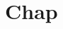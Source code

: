 \documentclass{book}
\newcommand{\Texinfothechapterheading}{}
\newcommand{\Texinfoheadingchaptername}{\chaptername}
\newcommand{\Texinfochapter}[1]{\chapter{#1}
\renewcommand{\Texinfothechapterheading}{\Texinfoheadingchaptername{} \thechapter{} }%
}%
\renewcommand{\_}{\Texinfounderscore\discretionary{}{}{}}
\begin{document}
\label{anchor:Top}%
\Texinfochapter{{Chap}}
\label{anchor:chap}%
\end{document}
